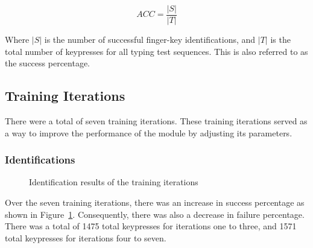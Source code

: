\documentclass[preprint,12pt,authoryear]{elsarticle}
\begin{document}
\begin{equation}
	ACC = \frac{|S|}{|T|}
\end{equation}

Where $|S|$ is the number of successful finger-key identifications, and $|T|$ is
the total number of keypresses for all typing test sequences. This is also
referred to as the success percentage.

\subsection{Training Iterations}
There were a total of seven training iterations. These training iterations
served as a way to improve the performance of the module by adjusting its
parameters.

\subsubsection{Identifications}

\begin{figure}[H]
	\centering
	\caption{Identification results of the training iterations}
	\label{fig:rd-training-identification}
\end{figure}

Over the seven training iterations, there was an increase in success percentage
as shown in Figure~\ref{fig:rd-training-identification}. Consequently, there was
also a decrease in failure percentage. There was a total of 1475 total
keypresses for iterations one to three, and 1571 total keypresses for iterations
four to seven.
\end{document}
